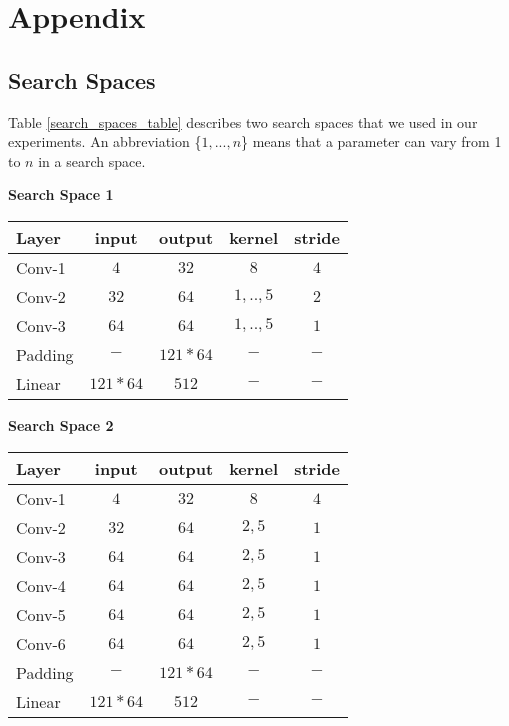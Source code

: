 \documentclass{svproc}
\begin{document}
\section{Appendix}
\begin{appendix}
\section{Search Spaces}
\label{app:search-spaces}
Table \ref{search_spaces_table} describes two search spaces that we used in our experiments. An abbreviation \{$1, ..., n$\} means that a parameter can vary from 1 to $n$ in a search space.
\begin{table*}[!h]
\begin{multicols}{2}
    \begin{center}
    \textbf{Search Space 1}
    \begin{tabularx}{0.5\textwidth} {@{}lcccc@{}}
        \hline
        \textbf{Layer} & \textbf{input} & \textbf{output} & \textbf{kernel} & \textbf{stride}\\
        \hline
        Conv-1 & $4$ & $32$ & $8$ & $4$         \\
        Conv-2 & $32$ & $64$ & $1, .., 5$ & $2$ \\
        Conv-3 & $64$ & $64$ & $1, .., 5$ & $1$ \\
        Padding & $-$ & $121*64$ & $-$ & $-$    \\        
        Linear & $121*64$ & $512$ & $-$ & $-$   \\
        \hline

    \end{tabularx}
    \end{center}

    \vfill\eject
    
    \begin{center}
    \textbf{Search Space 2}
    \begin{tabularx}{0.5\textwidth}{@{}lcccc@{}}
        \hline
        \textbf{Layer} & \textbf{input} & \textbf{output} & \textbf{kernel} & \textbf{stride}\\
        \hline
        Conv-1 & $4$ & $32$ & $8$ & $4$         \\
        Conv-2 & $32$ & $64$ & $2, 5$ & $1$     \\
        Conv-3 & $64$ & $64$ & $2, 5$ & $1$     \\
        Conv-4 & $64$ & $64$ & $2, 5$ & $1$     \\
        Conv-5 & $64$ & $64$ & $2, 5$ & $1$     \\
        Conv-6 & $64$ & $64$ & $2, 5$ & $1$     \\
        Padding & $-$ & $121*64$ & $-$ & $-$    \\        
        Linear & $121*64$ & $512$ & $-$ & $-$   \\
        \hline
    

\end{tabularx}
\end{center}
\end{multicols}
\end{table*}
\end{appendix}
\end{document}
